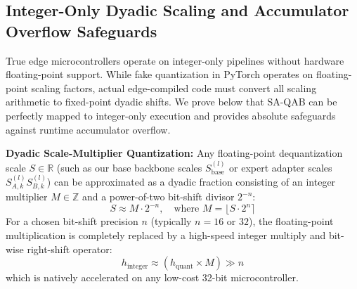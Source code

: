 \documentclass{article}
\theoremstyle{plain}
\theoremstyle{definition}
\theoremstyle{remark}
\begin{document}
\subsection{Integer-Only Dyadic Scaling and Accumulator Overflow Safeguards}
\label{sec:appendix_integer_only}
True edge microcontrollers operate on integer-only pipelines without hardware floating-point support. While fake quantization in PyTorch operates on floating-point scaling factors, actual edge-compiled code must convert all scaling arithmetic to fixed-point dyadic shifts. We prove below that SA-QAB can be perfectly mapped to integer-only execution and provides absolute safeguards against runtime accumulator overflow.

\textbf{Dyadic Scale-Multiplier Quantization:} Any floating-point dequantization scale $S \in \mathbb{R}$ (such as our base backbone scales $S_{\text{base}}^{(l)}$ or expert adapter scales $S_{A,k}^{(l)} S_{B,k}^{(l)}$) can be approximated as a dyadic fraction consisting of an integer multiplier $M \in \mathbb{Z}$ and a power-of-two bit-shift divisor $2^{-n}$:
\begin{equation}
    S \approx M \cdot 2^{-n}, \quad \text{where } M = \lfloor S \cdot 2^n \rceil
\end{equation}
For a chosen bit-shift precision $n$ (typically $n = 16$ or $32$), the floating-point multiplication is completely replaced by a high-speed integer multiply and bit-wise right-shift operator:
\begin{equation}
    h_{\text{integer}} \approx \left( h_{\text{quant}} \times M \right) \gg n
\end{equation}
which is natively accelerated on any low-cost 32-bit microcontroller.
\end{document}
